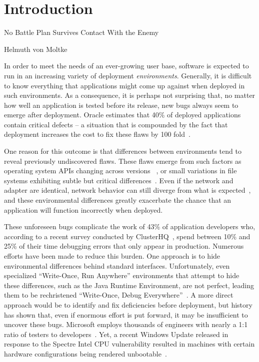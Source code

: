 \chapter{Introduction}
\label{chap:intro}

\epigraph{No Battle Plan Survives Contact With the Enemy}{Helmuth von Moltke}

In order to meet the needs of an ever-growing user base,
software is expected to run in an increasing variety of deployment \emph{environments}.
Generally, it is difficult to know everything that applications might come up against when deployed in such environments. As a consequence, it is perhaps not surprising that, no matter how well an application is tested before its release,
new bugs always seem to emerge after deployment.
Oracle estimates that 40\% of deployed applications
contain critical defects -- a situation that is compounded
by the fact that deployment
increases the cost to fix these flaws by 100 fold~\cite{OracleAppQuality}.

One reason for this outcome
is that differences between environments tend to
reveal previously undiscovered flaws.
These flaws emerge from
such factors as
operating system APIs changing across versions
~\cite{LinuxGlibcChanges, WinAPICompat, MuslDifferences},
or small variations in file systems exhibiting subtle but critical
differences~\cite{EXT4Layout, AppleHFS, WindowsNTFS}.
Even if the network and adapter are identical,
network behavior can still diverge from what is expected~\cite{vbox,
NMAPOSDifferences, VMWareNATFailure},
and these environmental differences greatly exacerbate
the chance that an application will function incorrectly when deployed.

These unforeseen bugs
complicate the work of 43\% of application developers who, according to a
recent survey conducted by ClusterHQ~\cite{ClusterHQSurvey},
spend between 10\% and 25\% of their time
debugging errors that only appear in production.
Numerous efforts have been made to reduce this burden.
One approach
is to hide environmental differences behind standard interfaces.
Unfortunately,
even specialized ``Write-Once, Run Anywhere'' environments
that attempt to hide these differences,
such as the Java Runtime Environment,
are not perfect,
leading them to be rechristened ``Write-Once, Debug Everywhere''~\cite{WODE}.
A more direct approach would be
to identify and fix deficiencies before deployment,
but history has shown that,
even if enormous effort is put forward,
it may be insufficient to uncover these bugs.
Microsoft employs thousands of engineers with nearly a
1:1 ratio of testers to developers~\cite{Page2009}.
Yet, a recent Windows Update released
in response to the Spectre Intel CPU vulnerability
resulted in machines with certain hardware configurations
being rendered unbootable~\cite{kb4056892}.

